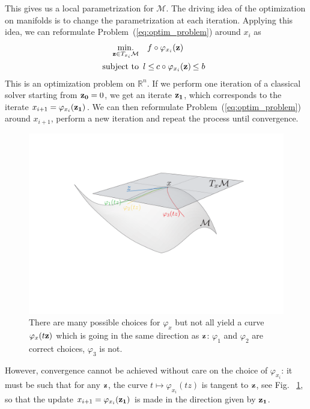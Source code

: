 This gives us a local parametrization for $\mathcal{M}$.
The driving idea of the optimization on manifolds is to change the parametrization at each iteration.
Applying this idea, we can reformulate Problem~(\ref{eq:optim_problem}) around $x_i$ as
\begin{align}
\label{eq:local_problem}
\minimize_{{\bf z} \in T_{x_i}\mathcal{M}} & \quad f \circ \varphi_{x_i}({\bf z}) \\
  \text{subject to}&
  \begin{array}{rcl}
    {l} \leq & \reduce{c \circ \varphi_{x_i}({\bf z})}{8}& \leq {b} \nonumber
  \end{array}
\end{align}
This is an optimization problem on $\mathbb{R}^n$.
If we perform one iteration of a classical solver starting from ${\bf z_0} = 0$, we get an iterate ${\bf z_1}$, which corresponds to the iterate $x_{i+1} = \varphi_{x_i}({\bf z_1})$.
We can then reformulate Problem~(\ref{eq:optim_problem}) around $x_{i+1}$, perform a new iteration and repeat the process until convergence.

\begin{figure}[!htb]
  \centering
  \includegraphics[width=.9\linewidth]{Humanoids2015/manifold.pdf}
  \caption{There are many possible choices for $\varphi_{x}$ but not all yield a curve $\varphi_{x}(t{\bf z})$ which is going in the same direction as ${\bf z}$: $\varphi_{1}$ and $\varphi_{2}$ are correct choices, $\varphi_{3}$ is not.}
\label{fig:phimap}
\end{figure}

However, convergence cannot be achieved without care on the choice of $\varphi_{x_i}$: it must be such that for any ${\bf z}$, the curve $t \mapsto \varphi_{x_i}(tz)$ is tangent to ${\bf z}$, see Fig.
~\ref{fig:phimap}, so that the update $x_{i+1} = \varphi_{x_i}({\bf z_1})$ is made in the direction given by ${\bf z_1}$.

